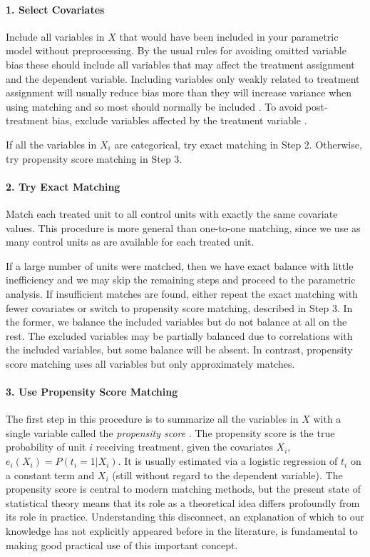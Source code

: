 \documentclass[11pt,titlepage]{article}
\begin{document}
\paragraph{1. Select Covariates}  
Include all variables in $X$ that would have been included in your
parametric model without preprocessing.  By the usual rules for
avoiding omitted variable bias these should include all variables that
may affect the treatment assignment and the dependent variable.
Including variables only weakly related to treatment assignment will
usually reduce bias more than they will increase variance when using
matching and so most should normally be included \citep{RubTho96,
  HecIchSmi98}.  To avoid post-treatment bias, exclude variables
affected by the treatment variable
\citep{FraRub02,Greenland03,KinZen04}.

If all the variables in $X_i$ are categorical, try exact matching in
Step 2.  Otherwise, try propensity score matching in Step 3.
\paragraph{2. Try Exact Matching}  
Match each treated unit to all control units with exactly the same
covariate values.  This procedure is more general than one-to-one
matching, since we use as many control units as are available for each
treated unit.

If a large number of units were matched, then we have exact balance
with little inefficiency and we may skip the remaining steps and
proceed to the parametric analysis.  If insufficient matches are
found, either repeat the exact matching with fewer covariates or
switch to propensity score matching, described in Step 3.  In the
former, we balance the included variables but do not balance at all on
the rest.  The excluded variables may be partially balanced due to
correlations with the included variables, but some balance will be
absent.  In contrast, propensity score matching uses all variables
but only approximately matches.

\paragraph{3. Use Propensity Score Matching}  
The first step in this procedure is to summarize all the variables in
$X$ with a single variable called the \emph{propensity score}
\citep{RosRub83}.  The propensity score is the true probability of
unit $i$ receiving treatment, given the covariates $X_i$, $e_i(X_i) =
P(t_i=1 | X_i)$.  It is usually estimated via a logistic regression of
$t_i$ on a constant term and $X_i$ (still without regard to the
dependent variable).  The propensity score is central to modern
matching methods, but the present state of statistical theory means
that its role as a theoretical idea differs profoundly from its role
in practice.  Understanding this disconnect, an explanation of which
to our knowledge has not explicitly appeared before in the literature,
is fundamental to making good practical use of this important concept.
\end{document}
